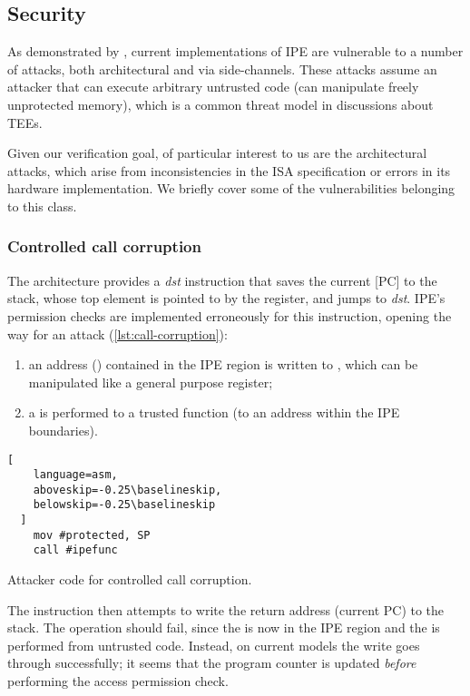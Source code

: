 \subsection{Security}
\label{sec:ipe-attacks}

As demonstrated by \cite{Bognar2024}, current implementations of IPE are vulnerable to a number of attacks, both architectural and via side-channels. These attacks assume an attacker that can execute arbitrary untrusted code (\ie can manipulate freely unprotected memory), which is a common threat model in discussions about TEEs.

Given our verification goal, of particular interest to us are the architectural attacks, which arise from inconsistencies in the ISA specification or errors in its hardware implementation. We briefly cover some of the vulnerabilities belonging to this class.

\subsubsection{Controlled call corruption}
\label{sec:call-corruption}

The \msp architecture provides a  \emph{dst} instruction that saves the current [PC] to the stack, whose top element is pointed to by the  register, and jumps to \emph{dst}. IPE's permission checks are implemented erroneously for this instruction, opening the way for an attack (\cref{lst:call-corruption}):
\begin{enumerate}
\item an address () contained in the IPE region is written to , which can be manipulated like a general purpose register;
\item a  is performed to a trusted function (\ie to an address  within the IPE boundaries).
\end{enumerate}

\begin{listing}[b]
  \begin{lstlisting}[
    language=asm,
    aboveskip=-0.25\baselineskip,
    belowskip=-0.25\baselineskip
  ]
    mov #protected, SP
    call #ipefunc
  \end{lstlisting}
  \caption{Attacker code for controlled call corruption.}
  \label{lst:call-corruption}
\end{listing}


The  instruction then attempts to write the return address (current PC) to the stack. The operation should fail, since the  is now in the IPE region and the  is performed from untrusted code. Instead, on current models the write goes through successfully; it seems that the program counter is updated \emph{before} performing the access permission check.

